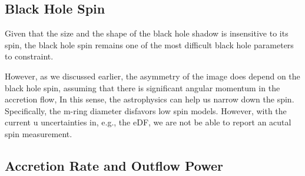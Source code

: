 \subsection{Black Hole Spin}


Given that the size and the shape of the black hole shadow is
insensitive to its spin, the black hole spin remains one of the most
difficult black hole parameters to constraint.

However, as we discussed earlier, the asymmetry of the image does
depend on the black hole spin, assuming that there is significant
angular momentum in the accretion flow, In this sense, the
astrophysics can help us narrow down the spin.
Specifically, the m-ring diameter disfavors low spin models.
However, with the current u uncertainties in, e.g., the eDF, we are
not be able to report an acutal spin measurement.

\subsection{Accretion Rate and Outflow Power}


